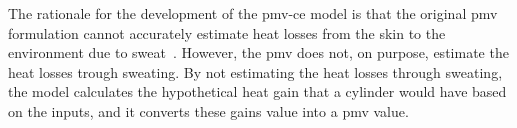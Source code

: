 The rationale for the development of the \ac{pmv-ce} model is that the original \ac{pmv} formulation cannot accurately estimate heat losses from the skin to the environment due to sweat~\cite{huang_applicability_2014}.
However, the \ac{pmv} does not, on purpose, estimate the heat losses trough sweating.
By not estimating the heat losses through sweating, the model calculates the hypothetical heat gain that a cylinder would have based on the inputs, and it converts these gains value into a \ac{pmv} value.

